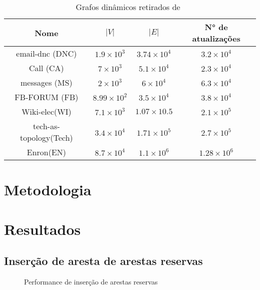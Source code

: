 \begin{table}
\begin{center}
\begin{tabular}{ |c|c|c|c| } 
 \hline
	Nome & $|V|$ & $|E|$ & N° de atualizações\\
 \hline
	email-dnc (DNC)&$1.9\times 10^3$&$3.74\times 10^4$&$3.2\times 10^4$\\
 \hline
	Call (CA)&$7\times 10^3$&$5.1\times 10^4$&$2.3\times 10^4$\\
 \hline
	messages (MS)&$2\times 10^3$&$6\times 10^4$&$6.3\times 10^4$\\
 \hline
	FB-FORUM (FB)&$8.99\times 10^2$&$3.5\times 10^4$&$3.8\times 10^4$\\
 \hline
	Wiki-elec(WI)&$7.1\times 10^3$&$1.07\times 10.5$&$2.1\times 10^5$\\
 \hline
	tech-as-topology(Tech)&$3.4\times 10^4$&$1.71\times 10^5$&$2.7\times 10^5$\\
 \hline
	Enron(EN)&$8.7\times 10^4$&$1.1\times 10^6$&$1.28\times 10^6$\\
 \hline
\end{tabular}
\caption{Grafos dinâmicos retirados de~\cite{nr-aaai15}}
\label{tab:datasets}
\end{center}
\end{table}


\section{Metodologia}

\cite{guideXP1999}

\section{Resultados}


\newpage

\subsection{Inserção de aresta de arestas reservas}
\legenda
\begin{figure}
\caption{Performance de inserção de arestas reservas}
\end{figure}



